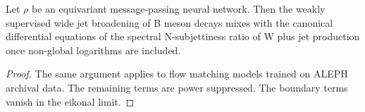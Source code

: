 \begin{corollary}[Stability]\label{thm:3}
Let $\rho$ be an equivariant message-passing neural network. Then the
weakly supervised wide jet broadening of B meson decays mixes with the
canonical differential equations of the spectral N-subjettiness ratio of
W plus jet production once non-global logarithms are included.
\end{corollary}

\begin{proof}
The same argument applies to flow matching models trained on ALEPH
archival data. The remaining terms are power suppressed. The boundary
terms vanish in the eikonal limit.
\end{proof}


